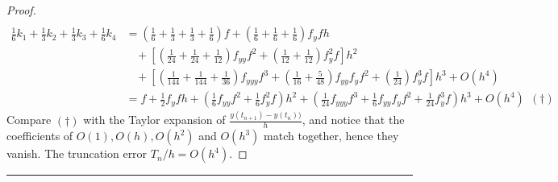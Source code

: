 \documentclass[a4paper, 10pt]{article}
\theoremstyle{definition}
\theoremstyle{hSol}
\begin{document}
\begin{proof}
\begin{equation}
\begin{split}
  \end{split}
\end{equation}
\begin{equation}
  \begin{split}
    \tfrac{1}{6}k_1 + \tfrac{1}{3}k_2 + \tfrac{1}{3}k_3 + \tfrac{1}{6}k_4 &= (\tfrac{1}{6} + \tfrac{1}{3} + \tfrac{1}{3} + \tfrac{1}{6}) f + (\tfrac{1}{6} + \tfrac{1}{6} + \tfrac{1}{6}) f_yfh \\
    &~~~~+[(\tfrac{1}{24} + \tfrac{1}{24} + \tfrac{1}{12})f_{yy}f^2 + (\tfrac{1}{12} + \tfrac{1}{12})f_y^2f]h^2 \\
    &~~~~+[(\tfrac{1}{144}+\tfrac{1}{144}+\tfrac{1}{36})f_{yyy}f^3+(\tfrac{1}{16}+\tfrac{5}{48})f_{yy}f_yf^2+(\tfrac{1}{24})f_y^3f]h^3  + O(h^4) \\
    &= f + \tfrac{1}{2}f_yfh + (\tfrac{1}{6}f_{yy}f^2+\tfrac{1}{6}f_y^2f)h^2 + (\tfrac{1}{24}f_{yyy}f^3+\tfrac{1}{6}f_{yy}f_yf^2+\tfrac{1}{24}f_y^3f)h^3 + O(h^4)~~(\dag)
  \end{split}
\end{equation}
Compare $(\dag)$ with the Taylor expansion of $\frac{y(t_{n+1})-y(t_n))}{h}$, and notice that the coefficients of $O(1), O(h), O(h^2)$ and $O(h^3)$ match together, hence they vanish. The truncation error $T_n/h = O(h^4)$. 
\end{proof} 
\noindent\rule{16cm}{0.4pt}
\end{document}
